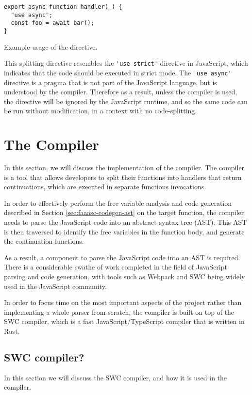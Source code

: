 \begin{listing}[H]
\begin{verbatim}
export async function handler(_) {
  "use async";
  const foo = await bar();
}
\end{verbatim}
\caption{Example usage of the directive.}
\label{listing:use-async-simple-example}
\end{listing}

This splitting directive resembles the \verb|'use strict'| directive in JavaScript, which indicates that the code should be executed in strict mode. The \verb|'use async'| directive is a pragma that is not part of the JavaScript language, but is understood by the \faaasc{} compiler. Therefore as a result, unless the \faaasc{} compiler is used, the directive will be ignored by the JavaScript runtime, and so the same code can be run without modification, in a context with no code-splitting.

\section{The \faaasc{} Compiler}
In this section, we will discuss the implementation of the \faaasc{} compiler. The \faaasc{} compiler is a tool that allows developers to split their functions into handlers that return continuations, which are executed in separate \awslambda{} functions invocations.

In order to effectively perform the free variable analysis and code generation described in Section \ref{sec:faaasc-codegen-ast} on the target \faas{} function, the \faaasc{} compiler needs to parse the JavaScript code into an abstract syntax tree (AST). This AST is then traversed to identify the free variables in the function body, and generate the continuation functions.

As a result, a component to parse the JavaScript code into an AST is required. There is a considerable swathe of work completed in the field of JavaScript parsing and code generation, with tools such as Webpack\cite{Webpack} and SWC\cite{RustbasedPlatformWeb} being widely used in the JavaScript community.

In order to focus time on the most important aspects of the project rather than implementing a whole parser from scratch, the \faaasc{} compiler is built on top of the SWC compiler, which is a fast JavaScript/TypeScript compiler that is written in Rust.

\subsection{SWC compiler?}
In this section we will discuss the SWC compiler, and how it is used in the \faaasc{} compiler.


